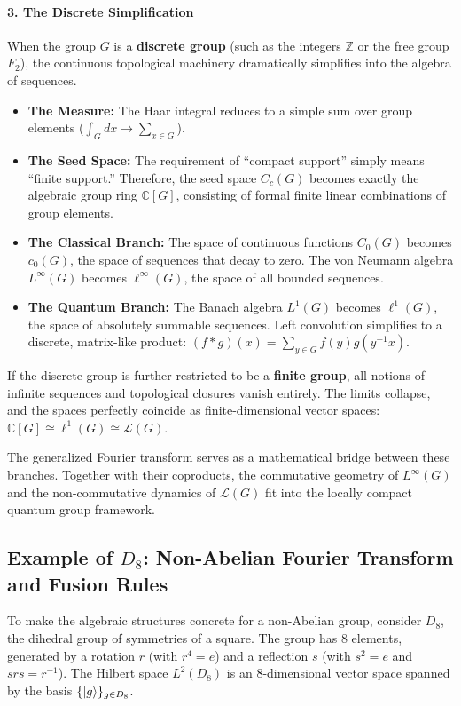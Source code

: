 \documentclass[11pt]{article}
\begin{document}
\paragraph{3. The Discrete Simplification}
When the group $G$ is a \textbf{discrete group} (such as the integers $\mathbb{Z}$ or the free group $F_2$), the continuous topological machinery dramatically simplifies into the algebra of sequences.
\begin{itemize}
    \item \textbf{The Measure:} The Haar integral reduces to a simple sum over group elements ($\int_G dx \to \sum_{x \in G}$).
    \item \textbf{The Seed Space:} The requirement of ``compact support'' simply means ``finite support.'' Therefore, the seed space $C_c(G)$ becomes exactly the algebraic group ring $\mathbb{C}[G]$, consisting of formal finite linear combinations of group elements.
    \item \textbf{The Classical Branch:} The space of continuous functions $C_0(G)$ becomes $c_0(G)$, the space of sequences that decay to zero. The von Neumann algebra $L^\infty(G)$ becomes $\ell^\infty(G)$, the space of all bounded sequences.
    \item \textbf{The Quantum Branch:} The Banach algebra $L^1(G)$ becomes $\ell^1(G)$, the space of absolutely summable sequences. Left convolution simplifies to a discrete, matrix-like product: $(f * g)(x) = \sum_{y \in G} f(y)g(y^{-1}x)$.
\end{itemize}

If the discrete group is further restricted to be a \textbf{finite group}, all notions of infinite sequences and topological closures vanish entirely. The limits collapse, and the spaces perfectly coincide as finite-dimensional vector spaces: $\mathbb{C}[G] \cong \ell^1(G) \cong \mathcal{L}(G)$.

The generalized Fourier transform serves as a mathematical bridge between these branches. Together with their coproducts, the commutative geometry of $L^\infty(G)$ and the non-commutative dynamics of $\mathcal{L}(G)$ fit into the locally compact quantum group framework.

\subsection[Example of D8]{Example of $D_8$: Non-Abelian Fourier Transform and Fusion Rules}

To make the algebraic structures concrete for a non-Abelian group, consider $D_8$, the dihedral group of symmetries of a square. The group has 8 elements, generated by a rotation $r$ (with $r^4=e$) and a reflection $s$ (with $s^2=e$ and $srs = r^{-1}$). The Hilbert space $L^2(D_8)$ is an 8-dimensional vector space spanned by the basis $\{\ket{g}\}_{g \in D_8}$.
\end{document}
